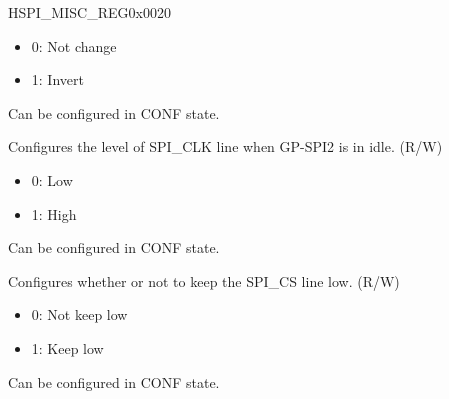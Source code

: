 \begin{register}{H}{SPI\_MISC\_REG}{0x0020}
\begin{regdesc}
\begin{reglist}
\begin{itemize}
    \item 0: Not change
    \item 1: Invert
\end{itemize}
Can be configured in CONF state.
\label{fielddesc:SPICKIDLEEDGE}\item [SPI\_CK\_IDLE\_EDGE] Configures the level of SPI\_CLK line when GP-SPI2 is in idle. (R/W)\\
\begin{itemize}
    \item 0: Low
    \item 1: High
\end{itemize}
Can be configured in CONF state.
\label{fielddesc:SPICSKEEPACTIVE}\item [SPI\_CS\_KEEP\_ACTIVE] Configures whether or not to keep the SPI\_CS line low. (R/W)\\
\begin{itemize}
    \item 0: Not keep low
    \item 1: Keep low
\end{itemize}
Can be configured in CONF state.
\end{reglist}\end{regdesc}
\end{register}


